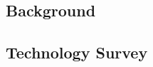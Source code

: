 \documentclass[a4paper,12pt]{article}
\numberwithin{equation}{section}
\numberwithin{figure}{section}
\numberwithin{table}{section}
\begin{document}
\subsection{Background}













\newpage
\subsection{Technology Survey}
\end{document}
